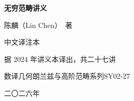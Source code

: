\begin{titlepage}
\centering
\vspace*{3.2cm}
{\Huge\bfseries 无穷范畴讲义\par}
\vspace{1.1cm}
{\LARGE 陈麟（Lin Chen）\ 著\par}
\vspace{2.2cm}
{\Large 中文译注本\par}
\vspace{0.5cm}
{\large 据 2024 年讲义本译出，共二十七讲\par}
\vfill
{\small 数译\quad 几何朗兰兹与高阶范畴系列\quad SY02-27\par}
\vspace{0.4cm}
{\small 二〇二六年\par}
\end{titlepage}
